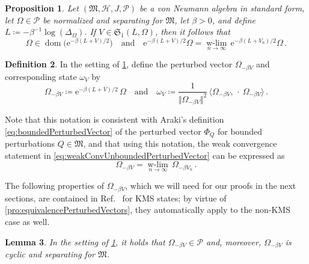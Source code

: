 \documentclass[a4paper, twoside, 11pt, reqno]{amsart}
\theoremstyle{definition}
\newtheorem{definition}{Definition}[section]
\theoremstyle{plain}
\newtheorem{proposition}[definition]{Proposition}
\newtheorem{lemma}[definition]{Lemma}
\renewcommand{\Delta}{\varDelta}
\renewcommand{\Phi}{\varPhi}
\renewcommand{\Omega}{\varOmega}
\newcommand{\MH}{\mathcal{H}}
\newcommand{\MFM}{\mathfrak{M}}
\newcommand{\MFS}{\mathfrak{S}}
\newcommand{\ee}{\mathrm{e}}
\newcommand{\NPC}{\mathcal{P}}
\newcommand{\1}{\mathbf{1}}
\newcommand{\dlim}[2]{\operatorname*{\text{$#1$}-lim}_{#2}\,}
\DeclareMathOperator{\dom}{dom}
\newcommand{\norm}[2][]{#1\Vert{#2}#1\Vert}
\newcommand{\braket}[2][]{#1\langle{#2}#1\rangle}
\newcommand{\ce}{\coloneqq}
\newcommand{\inv}[1]{#1^{-1}}
\newcommand{\tand}{\quad\text{and}\quad}
\begin{document}
\begin{proposition}\label{pro:unboundedPerturbedVector}
    Let $(\MFM, \MH, J, \NPC)$ be a von Neumann algebra in standard form, let $\Omega \in \NPC$ be normalized and separating for $\MFM$, let $\beta > 0$, and define $L \ce - \inv{\beta} \log(\Delta_\Omega)$. If $V \in \MFS_1(L, \Omega)$, then it follows that
    \begin{equation}\label{eq:weakConvUnboundedPerturbedVector}
        \Omega \in \dom \bigl(\ee^{- \beta (L + V) / 2}\bigr) \tand \ee^{- \beta (L + V) / 2} \Omega = \dlim{w}{n \to \infty} \ee^{- \beta (L + V_n) / 2} \Omega \, .
    \end{equation}
\end{proposition}

\begin{definition}\label{def:unboundedPerturbedState}
    In the setting of \cref{pro:unboundedPerturbedVector}, define the perturbed vector $\Omega_{- \beta V}$ and corresponding state $\omega_V$ by
    \begin{equation}\label{eq:unboundedPerturbedVector}
        \Omega_{- \beta V} \ce \ee^{- \beta (L + V) / 2} \, \Omega \tand \omega_V \ce \frac{1}{\norm{\Omega_{-\beta V}}^2} \, \braket{\Omega_{-\beta V}, \,\cdot\ \Omega_{-\beta V}} \, .
    \end{equation}
\end{definition}

Note that this notation is consistent with Araki's definition \eqref{eq:boundedPerturbedVector} of the perturbed vector $\Phi_Q$ for bounded perturbations $Q \in \MFM$, and that using this notation, the weak convergence statement in \cref{eq:weakConvUnboundedPerturbedVector} can be expressed as
\begin{equation*}
    \Omega_{- \beta V} = \dlim{w}{n \to \infty} \Omega_{- \beta V_n} \, .
\end{equation*}

The following properties of $\Omega_{- \beta V}$, which we will need for our proofs in the next sections, are contained in Ref.~\cite[Thm. 5.5 (2) \& (3)]{DJP03} for KMS states; by virtue of \cref{pro:equivalencePerturbedVectors}, they automatically apply to the non-KMS case as well.

\begin{lemma}\label{lem:perturbedVectorSeparating}
    In the setting of \cref{pro:unboundedPerturbedVector}, it holds that $\Omega_{- \beta V} \in \NPC$ and, moreover, $\Omega_{- \beta V}$ is cyclic and separating for $\MFM$.
\end{lemma}
    
\end{document}
